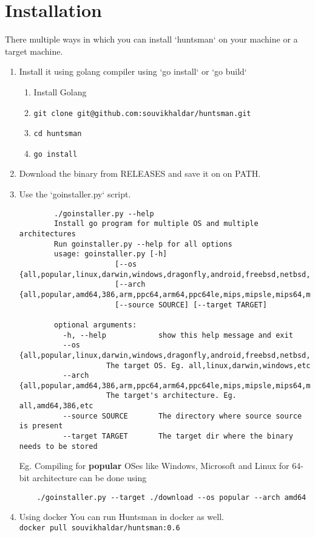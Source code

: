 \documentclass[12pt]{article}
\begin{document}
\section{Installation}
There multiple ways in which you can install `huntsman` on your machine or a target machine.  
\begin{enumerate}
	\item Install it using golang compiler using `go install` or `go build`
	\begin{enumerate}
		\item Install Golang
		\item \verb|git clone git@github.com:souvikhaldar/huntsman.git|
		\item \verb|cd huntsman|
		\item \verb|go install|
	\end{enumerate}

	\item Download the binary from RELEASES and save it on on PATH.  

	\item Use the `goinstaller.py` script.  
		\begin{verbatim}
		./goinstaller.py --help 
		Install go program for multiple OS and multiple architectures
		Run goinstaller.py --help for all options
		usage: goinstaller.py [-h]
				      [--os {all,popular,linux,darwin,windows,dragonfly,android,freebsd,netbsd,openbsd,plan9,solaris,aixjs}]
				      [--arch {all,popular,amd64,386,arm,ppc64,arm64,ppc64le,mips,mipsle,mips64,mips64le,s390x}]
				      [--source SOURCE] [--target TARGET]

		optional arguments:
		  -h, --help            show this help message and exit
		  --os {all,popular,linux,darwin,windows,dragonfly,android,freebsd,netbsd,openbsd,plan9,solaris,aixjs}
					The target OS. Eg. all,linux,darwin,windows,etc
		  --arch {all,popular,amd64,386,arm,ppc64,arm64,ppc64le,mips,mipsle,mips64,mips64le,s390x}
					The target's architecture. Eg. all,amd64,386,etc
		  --source SOURCE       The directory where source source is present
		  --target TARGET       The target dir where the binary needs to be stored
		\end{verbatim}
	Eg. Compiling for \textbf{popular} OSes like Windows, Microsoft and Linux for 64-bit architecture can be done using
		\begin{verbatim}
	./goinstaller.py --target ./download --os popular --arch amd64
		\end{verbatim}

	\item Using docker
	You can run Huntsman in docker as well.\\
	\verb|docker pull souvikhaldar/huntsman:0.6|
\end{enumerate}
\end{document}
